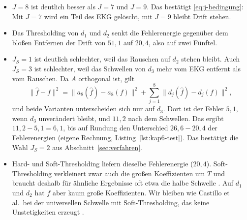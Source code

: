 \documentclass[a4paper,11pt,bibliography=totoc,listof=totoc,headinclude=true,cleardoublepage=empty,oneside]{scrbook}
\theoremstyle{plain}
\theoremstyle{definition}
\newcommand{\norm}[1]{\lVert #1 \rVert}
\begin{document}
\begin{itemize}
\item $J = 8$ ist deutlich besser als $J = 7$ und $J = 9$. Das bestätigt
  \eqref{eq:j-bedingung}: Mit $J = 7$ wird ein Teil des EKG gelöscht, mit
  $J = 9$ bleibt Drift stehen.
\item Das Thresholding von $d_1$ und $d_2$ senkt die Fehlerenergie gegenüber
  dem blo\ss en Entfernen der Drift von $51{,}1$ auf $20{,}4$, also auf zwei
  Fünftel.
\item $J_S = 1$ ist deutlich schlechter, weil das Rauschen auf $d_2$
  stehen bleibt. Auch $J_S = 3$ ist schlechter, weil das Schwellen von $d_3$
  mehr vom EKG entfernt als vom Rauschen. Da $A$ orthogonal ist, gilt
  \[
    \norm{\hat f - f}^2 = \norm{a_8(\hat f) - a_8(f)}^2
    + \sum_{j=1}^{8} \norm{d_j(\hat f) - d_j(f)}^2 ,
  \]
  und beide Varianten unterscheiden sich nur auf $d_3$. Dort ist der Fehler
  $5{,}1$, wenn $d_3$ unverändert bleibt, und $11{,}2$ nach dem Schwellen. Das
  ergibt $11{,}2 - 5{,}1 = 6{,}1$, bis auf Rundung den Unterschied
  $26{,}6 - 20{,}4$ der Fehlerenergien (eigene Rechnung,
  Listing~\ref{lst:kap6-test}). Das bestätigt die Wahl $J_S = 2$ aus
  Abschnitt~\ref{sec:verfahren}.
\item Hard- und Soft-Thresholding liefern dieselbe Fehlerenergie
  ($20{,}4$). Soft-Thresholding verkleinert zwar auch die gro\ss en
  Koeffizienten um $T$ und braucht deshalb für ähnliche Ergebnisse oft etwa
  die halbe Schwelle \cite[Kap.~11.2.2]{mallat}. %
  Auf $d_1$ und $d_2$ hat $f$ aber kaum gro\ss e Koeffizienten. Wir bleiben
  wie Castillo et al.\ bei der universellen Schwelle mit Soft-Thresholding,
  das keine Unstetigkeiten erzeugt \cite[Abschn.~3.1.6, 4]{castillo}. %
\end{itemize}
\end{document}
